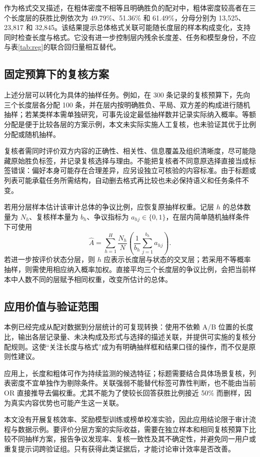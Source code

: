 \documentclass[UTF8,11pt,a4paper,fontset=windows]{ctexart}
\numberwithin{equation}{section}
\begin{document}
作为格式交叉描述，在粗体密度不相等且明确胜负的配对中，粗体密度较高者在三个长度层的获胜比例依次为 49.79\%、51.36\% 和 61.49\%，分母分别为 13,525、23,817 和 32,845。该结果提示总体格式关联可能随长度层的样本构成变化，支持同时检查长度与格式。它没有进一步控制层内残余长度差、任务和模型身份，不应与表\ref{tab:reg}的联合回归量相互替代。

\subsection{固定预算下的复核方案}
上述分层可以转化为具体的抽样任务。例如，在 300 条记录的复核预算下，先向三个长度层各分配 100 条，并在层内按明确胜负、平局、双方差的构成进行随机抽样；若某类样本需单独研究，可事先设定最低抽样数并记录实际纳入概率。等额分配是便于比较各层的方案示例，本文未实际实施人工复核，也未验证其优于比例分配或随机抽样。

复核者需同时评价双方内容的正确性、相关性、信息覆盖及组织清晰度，尽可能隐藏原始胜负标签，并记录复核选择与理由。不能把复核者不同意原选择直接当成标签错误：偏好本身可能存在合理差异，应另设独立可核验的内容标准。由于标题或列表可能承载任务所需结构，自动删去格式再比较也未必保持语义和任务条件不变。

若用分层样本估计该审计总体的争议比例，应恢复原抽样权重。记层 $h$ 的总体数量为 $N_h$、复核样本量为 $b_h$、争议指标为 $a_{hj}\in\{0,1\}$，在层内简单随机抽样条件下可使用
\begin{equation}
 \widehat A=\sum_{h=1}^{H}\frac{N_h}{N}
 \left(\frac{1}{b_h}\sum_{j=1}^{b_h}a_{hj}\right).
\end{equation}
若进一步按评价状态分层，则 $h$ 应表示长度层与状态的交叉层；若采用不等概率抽样，则需使用相应纳入概率加权。直接平均三个长度层的争议比例，会把当前样本中人数不同的层赋予相同权重，改变所估计的总体。

\subsection{应用价值与验证范围}
本例已经完成从配对数据到分层统计的可复现转换：使用不依赖 A/B 位置的长度比，输出各层记录量、未决构成及形式与选择的描述关联，并提供可实施的复核分配规则。这使“关注长度与格式”成为有明确抽样框和结果口径的操作，而不仅是原则性建议。

应用上，长度和粗体可作为持续监测的候选特征；标题需要结合具体场景复核，列表密度不宜单独作为剔除条件。关联强弱不能替代标签可靠性判断，也不能由当前 OR 直接推导去偏权重。尤其不能为了使较长回答获胜比例接近 50\% 而删样，因为真实内容优势也可能产生这一关联。

本文没有开展复核效率、奖励模型训练或榜单校准实验，因此应用结论限于审计流程与数据示例。要评价分层方案的实际收益，需要在独立样本和相同复核预算下比较不同抽样方案，报告争议发现率、复核一致性及其不确定性，并避免同一用户或重复提示词跨验证组。只有获得此类证据后，才能讨论审计效率是否改善。
\end{document}

